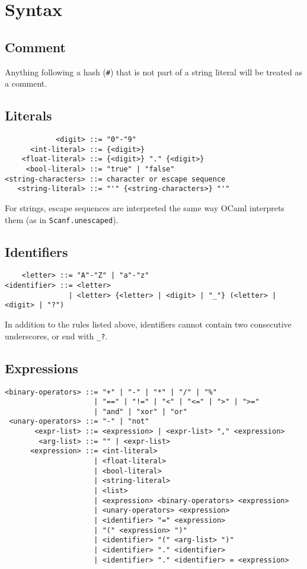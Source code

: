 \section{Syntax}

\subsection{Comment}
Anything following a hash (\verb|#|) that is not part of a string literal will be treated as a
comment.

\subsection{Literals}
\begin{verbatim}
            <digit> ::= "0"-"9"
      <int-literal> ::= {<digit>}
    <float-literal> ::= {<digit>} "." {<digit>}
     <bool-literal> ::= "true" | "false"
<string-characters> ::= character or escape sequence
   <string-literal> ::= "'" {<string-characters>} "'"
\end{verbatim}

For strings, escape sequences are interpreted the same way OCaml interprets them (as in
\verb|Scanf.unescaped|).

\subsection{Identifiers}
\begin{verbatim}
    <letter> ::= "A"-"Z" | "a"-"z"
<identifier> ::= <letter>
               | <letter> {<letter> | <digit> | "_"} (<letter> | <digit> | "?")
\end{verbatim}

In addition to the rules listed above, identifiers cannot contain two consecutive underscores,
or end with \verb|_?|.

\subsection{Expressions}
\begin{verbatim}
<binary-operators> ::= "+" | "-" | "*" | "/" | "%"
                     | "==" | "!=" | "<" | "<=" | ">" | ">="
                     | "and" | "xor" | "or"
 <unary-operators> ::= "-" | "not"
       <expr-list> ::= <expression> | <expr-list> "," <expression>
        <arg-list> ::= "" | <expr-list>
      <expression> ::= <int-literal>
                     | <float-literal>
                     | <bool-literal>
                     | <string-literal>
                     | <list>
                     | <expression> <binary-operators> <expression>
                     | <unary-operators> <expression>
                     | <identifier> "=" <expression>
                     | "(" <expression> ")"
                     | <identifier> "(" <arg-list> ")"
                     | <identifier> "." <identifier>
                     | <identifier> "." <identifier> = <expression>
\end{verbatim}

